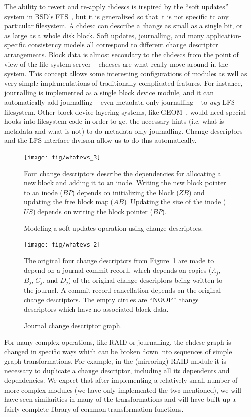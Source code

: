 The ability to revert and re-apply chdescs is inspired by the ``soft updates''
system in BSD's FFS~\cite{ganger00soft}, but it is generalized so that it is not
specific to any particular filesystem. A chdesc can describe a change as small
as a single bit, or as large as a whole disk block. Soft updates, journalling,
and many application-specific consistency models all correspond to different
change descriptor arrangements. Block data is almost secondary to the chdescs
from the point of view of the file system server -- chdescs are what really move
around in the system. This concept allows some interesting configurations of
modules as well as very simple implementations of traditionally complicated
features. For instance, journalling is implemented as a single block device
module, and it can automatically add journalling -- even metadata-only
journalling -- to {\it any} LFS filesystem. Other block device layering systems,
like GEOM~\cite{geom}, would need special hooks into filesystem code in order to
get the necessary hints (i.e. what is metadata and what is not) to do
metadata-only journalling. Change descriptors and the LFS interface division
allow us to do this automatically.

\begin{figure}
  \centering
  \texttt{[image: fig/whatevs\_3]}
  \caption{\label{fig:softupdates} Modeling a soft updates operation using
  change descriptors.}{Four change descriptors describe the dependencies for
  allocating a new block and adding it to an inode. Writing the new block
  pointer to an inode ($BP$) depends on initializing the block ($ZB$) and
  updating the free block map ($AB$). Updating the size of the inode ($US$)
  depends on writing the block pointer ($BP$).
}
\end{figure}

\begin{figure}
  \centering
  \texttt{[image: fig/whatevs\_2]}
  \caption{\label{fig:journal} Journal change descriptor graph.}{The original
  four change descriptors from Figure~\ref{fig:softupdates} are made to depend
  on a journal commit record, which depends on copies ($A_j$, $B_j$, $C_j$, and
  $D_j$) of the original change descriptors being written to the journal. A
  commit record cancellation depends on the original change descriptors. The
  empty circles are ``NOOP'' change descriptors which have no associated block
  data.
}
\end{figure}

For many complex operations, like RAID or journalling, the chdesc graph is
changed in specific ways which can be broken down into sequences of simple graph
transformations. For example, in the (mirroring) RAID module it is necessary to
duplicate a change descriptor, including all its dependents and dependencies. We
expect that after implementing a relatively small number of more complex modules
(we have only implemented the two mentioned), we will have seen similarities in
many of the transformations and will have built up a fairly complete library of
common transformation functions.

